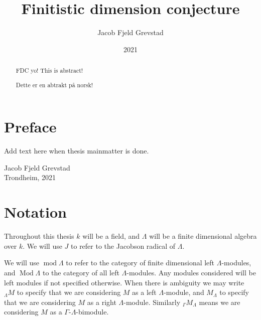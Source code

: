 \documentclass[11pt, a4paper, english]{article}
\theoremstyle{definition}
\DeclareMathOperator{\Mod}{Mod}
\def\mod{\operatorname{mod}}
\begin{document}
\title{Finitistic dimension conjecture}
\author{Jacob Fjeld Grevstad}
\date{2021}
{}

\begin{abstract}
FDC yo! This is abstract!
\end{abstract}

\begin{abstract}
	Dette er en abtrakt på norsk!
\end{abstract}
\clearpage

\section*{Preface}
%
Add text here when thesis mainmatter is done. 
\begin{flushright}
	Jacob Fjeld Grevstad\\ 
	Trondheim, 2021
\end{flushright}
\clearpage

\tableofcontents
{}%
\clearpage

\section*{Notation}
%

Throughout this thesis $k$ will be a field, and $\Lambda$ will be a finite dimensional algebra over $k$. We will use $J$ to refer to the Jacobson radical of $\Lambda$.


We will use $\mod\Lambda$ to refer to the category of finite dimensional left $\Lambda$-modules, and $\Mod\Lambda$ to the category of all left $\Lambda$-modules. Any modules considered will be left modules if not specified otherwise. When there is ambiguity we may write $_\Lambda M$ to specify that we are considering $M$ as a left $\Lambda$-module, and $M_\Lambda$ to specify that we are considering $M$ as a right $\Lambda$-module. Similarly $_\Gamma M_\Lambda$ means we are considering $M$ as a $\Gamma$-$\Lambda$-bimodule.
\end{document}
